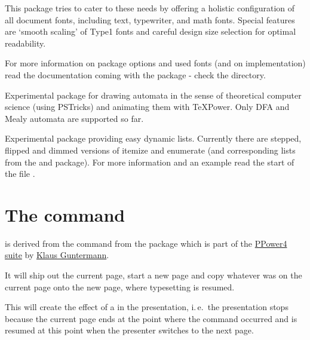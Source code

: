 \documentclass[12pt]{scrartcl}
\let\newslide=\relax
\begin{document}
This package tries to cater to these needs by offering a holistic configuration of all document fonts, including text,
typewriter, and math fonts. Special features are `smooth scaling' of Type1 fonts and careful design size selection for
optimal readability.

\newslide

For more information on package options and used fonts (and on implementation) read the documentation coming with the
package - check the  directory.

Experimental package for drawing automata in the sense of theoretical computer
science (using PSTricks) and animating them with TeXPower.  Only DFA and Mealy
automata are supported so far.

\newslide

Experimental package providing easy dynamic lists. Currently there are stepped, flipped and dimmed versions of itemize
and enumerate (and corresponding lists from the  and  package).  For more information
and an example read the start of the file .

\newslide

%
\section{The  command}\label{Sec:pause}
 is derived from the  command from the package
\href{http://www-sp.iti.informatik.tu-darmstadt.de/software/ppower4/pp4sty.zip}{} which is part of the
\href{http://www-sp.iti.informatik.tu-darmstadt.de/software/ppower4/}{PPower4 suite} by
\href{mailto:guntermann@iti.informatik.tu-darmstadt.de}{Klaus Guntermann}.

  It will ship out the current page, start a new page and copy whatever was on the current page onto the new page, where
  typesetting is resumed.


  This will create the effect of a  in the presentation, i.\,e.\ the presentation stops because the
  current page ends at the point where the  command occurred and is resumed at this point when the
  presenter switches to the next page.
\end{document}
